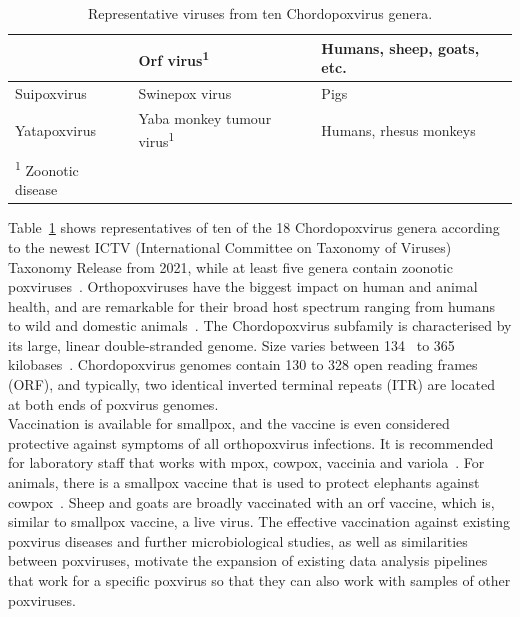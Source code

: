 \begin{table}[ht!]
\begin{tabular}{lll}
						& Orf virus\textsuperscript{1}                    & Humans, sheep, goats, etc.                  \\ \hline
	Suipoxvirus         & Swinepox virus                                  & Pigs                                        \\ \hline
	Yatapoxvirus        & Yaba monkey tumour virus\textsuperscript{1}     & Humans, rhesus monkeys                      \\ \hline
	\textsuperscript{1} Zoonotic disease &                                &                                             \\
	\end{tabular}
	\caption{Representative viruses from ten Chordopoxvirus genera.}
	\label{tab:2-chordopox}
\end{table}

Table~\ref{tab:2-chordopox} shows representatives of ten of the 18 Chordopoxvirus genera according to the newest ICTV (International Committee on Taxonomy of Viruses) Taxonomy Release from 2021, while at least five genera contain zoonotic poxviruses~\cite{tax2021pox}. Orthopoxviruses have the biggest impact on human and animal health, and are remarkable for their broad host spectrum ranging from humans to wild and domestic animals~\cite{fenner2000adventures}.
The Chordopoxvirus subfamily is characterised by its large, linear double-stranded genome. Size varies between 134~\cite{brunetti2003complete} to 365 kilobases~\cite{tulman2004genome}. Chordopoxvirus genomes contain 130 to 328 open reading frames (ORF), and typically, two identical inverted terminal repeats (ITR) are located at both ends of poxvirus genomes. \\
Vaccination is available for smallpox, and the vaccine is even considered protective against symptoms of all orthopoxvirus infections. It is recommended for laboratory staff that works with mpox, cowpox, vaccinia and variola~\cite{cono2003smallpox}. For animals, there is a smallpox vaccine that is used to protect elephants against cowpox~\cite{kurth2008rat}. Sheep and goats are broadly vaccinated with an orf vaccine, which is, similar to smallpox vaccine, a live virus. The effective vaccination against existing poxvirus diseases and further microbiological studies, as well as similarities between poxviruses, motivate the expansion of existing data analysis pipelines that work for a specific poxvirus so that they can also work with samples of other poxviruses.

